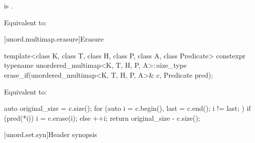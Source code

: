 \begin{itemdescr}
\pnum
\constraints
{} is .

\pnum
\effects
Equivalent to:
\end{itemdescr}

[unord.multimap.erasure]{Erasure}

%
\begin{itemdecl}
template<class K, class T, class H, class P, class A, class Predicate>
  constexpr typename unordered_multimap<K, T, H, P, A>::size_type
    erase_if(unordered_multimap<K, T, H, P, A>& c, Predicate pred);
\end{itemdecl}

\begin{itemdescr}
\pnum
\effects
Equivalent to:
\begin{codeblock}
auto original_size = c.size();
for (auto i = c.begin(), last = c.end(); i != last; ) {
  if (pred(*i)) {
    i = c.erase(i);
  } else {
    ++i;
  }
}
return original_size - c.size();
\end{codeblock}
\end{itemdescr}

[unord.set.syn]{Header  synopsis}

